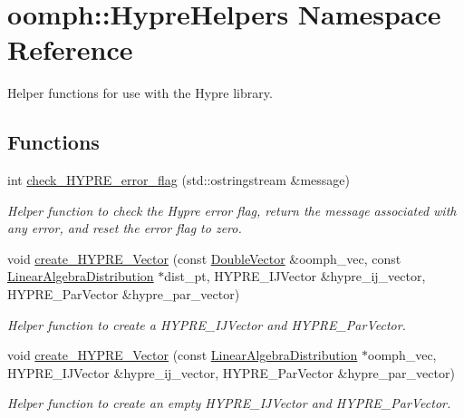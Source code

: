 \hypertarget{namespaceoomph_1_1HypreHelpers}{}\section{oomph\+:\+:Hypre\+Helpers Namespace Reference}
\label{namespaceoomph_1_1HypreHelpers}


Helper functions for use with the Hypre library.  


\subsection*{Functions}
\begin{DoxyCompactItemize}
\item 
int \hyperlink{namespaceoomph_1_1HypreHelpers_a65765f3019c585e17822f30423b52096}{check\+\_\+\+H\+Y\+P\+R\+E\+\_\+error\+\_\+flag} (std\+::ostringstream \&message)
\begin{DoxyCompactList}\small\item\em Helper function to check the Hypre error flag, return the message associated with any error, and reset the error flag to zero. \end{DoxyCompactList}\item 
void \hyperlink{namespaceoomph_1_1HypreHelpers_a550031a0d3e8b60296e42ef5e87d7b7f}{create\+\_\+\+H\+Y\+P\+R\+E\+\_\+\+Vector} (const \hyperlink{classoomph_1_1DoubleVector}{Double\+Vector} \&oomph\+\_\+vec, const \hyperlink{classoomph_1_1LinearAlgebraDistribution}{Linear\+Algebra\+Distribution} $\ast$dist\+\_\+pt, H\+Y\+P\+R\+E\+\_\+\+I\+J\+Vector \&hypre\+\_\+ij\+\_\+vector, H\+Y\+P\+R\+E\+\_\+\+Par\+Vector \&hypre\+\_\+par\+\_\+vector)
\begin{DoxyCompactList}\small\item\em Helper function to create a H\+Y\+P\+R\+E\+\_\+\+I\+J\+Vector and H\+Y\+P\+R\+E\+\_\+\+Par\+Vector. \end{DoxyCompactList}\item 
void \hyperlink{namespaceoomph_1_1HypreHelpers_a1954ae1f68448b32a57816f65c478481}{create\+\_\+\+H\+Y\+P\+R\+E\+\_\+\+Vector} (const \hyperlink{classoomph_1_1LinearAlgebraDistribution}{Linear\+Algebra\+Distribution} $\ast$oomph\+\_\+vec, H\+Y\+P\+R\+E\+\_\+\+I\+J\+Vector \&hypre\+\_\+ij\+\_\+vector, H\+Y\+P\+R\+E\+\_\+\+Par\+Vector \&hypre\+\_\+par\+\_\+vector)
\begin{DoxyCompactList}\small\item\em Helper function to create an empty H\+Y\+P\+R\+E\+\_\+\+I\+J\+Vector and H\+Y\+P\+R\+E\+\_\+\+Par\+Vector. \end{DoxyCompactList}\item 

\end{DoxyCompactItemize}
